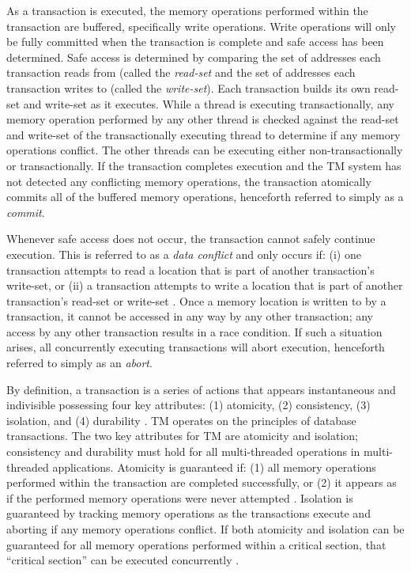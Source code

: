 \documentclass{sig-alternate}
\begin{document}

As a transaction is executed, the memory operations performed within the transaction are
buffered, specifically write operations.  Write operations will only be fully committed
when the transaction is complete and safe access has been determined.  Safe access is
determined by comparing the set of addresses each transaction reads from (called the
\emph{read-set} and the set of addresses each transaction writes to (called the
\emph{write-set}).  Each transaction builds its own read-set and write-set as it executes.
While a thread is executing transactionally, any memory operation performed by any other
thread is checked against the read-set and write-set of the transactionally executing
thread to determine if any memory operations conflict.  The other threads can be executing
either non-transactionally or transactionally.  If the transaction completes execution and
the TM system has not detected any conflicting memory operations, the transaction
atomically commits all of the buffered memory operations, henceforth referred to simply as
a \emph{commit}.

Whenever safe access does not occur, the transaction cannot safely continue execution.
This is referred to as a \emph{data conflict} and only occurs if: (i) one transaction
attempts to read a location that is part of another transaction's write-set, or (ii) a
transaction attempts to write a location that is part of another transaction's read-set or
write-set \cite{intel_prog_ref}.  Once a memory location is written to by a transaction,
it cannot be accessed in any way by any other transaction; any access by any other
transaction results in a race condition.  If such a situation arises, all concurrently
executing transactions will abort execution, henceforth referred to simply as an
\emph{abort}.

By definition, a transaction is a series of actions that appears instantaneous and
indivisible possessing four key attributes: (1) atomicity, (2) consistency, (3) isolation,
and (4) durability \cite{tm_2nd}.  TM operates on the principles of database transactions.
The two key attributes for TM are atomicity and isolation; consistency and durability must
hold for all multi-threaded operations in multi-threaded applications.  Atomicity is
guaranteed if: (1) all memory operations performed within the transaction are completed
successfully, or (2) it appears as if the performed memory operations were never attempted
\cite{tm_2nd}.  Isolation is guaranteed by tracking memory operations as the transactions
execute and aborting if any memory operations conflict.  If both atomicity and isolation
can be guaranteed for all memory operations performed within a critical section, that
``critical section'' can be executed concurrently \cite{sle_rajwar}.
\end{document}
